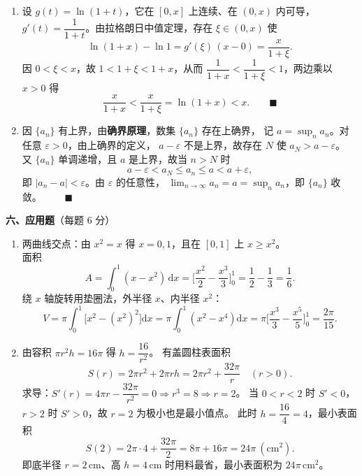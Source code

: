 \documentclass[12pt]{ctexart}
\theoremstyle{definition}
\begin{document}
\begin{enumerate}[label=\textbf{\arabic*.},itemsep=12pt]
\item 设 $g(t)=\ln(1+t)$，它在 $[0,x]$ 上连续、在 $(0,x)$ 内可导，
  $g'(t)=\dfrac{1}{1+t}$。由拉格朗日中值定理，存在 $\xi\in(0,x)$ 使
  \[
  \ln(1+x)-\ln 1=g'(\xi)\,(x-0)=\frac{x}{1+\xi}.
  \]
  因 $0<\xi<x$，故 $1<1+\xi<1+x$，从而
  $\dfrac{1}{1+x}<\dfrac{1}{1+\xi}<1$，两边乘以 $x>0$ 得
  \[
  \frac{x}{1+x}<\frac{x}{1+\xi}=\ln(1+x)<x. \qquad\blacksquare
  \]

\item 因 $\{a_{n}\}$ 有上界，由\textbf{确界原理}，数集 $\{a_{n}\}$ 存在上确界，
  记 $a=\sup_{n}a_{n}$。对任意 $\varepsilon>0$，由上确界的定义，
  $a-\varepsilon$ 不是上界，故存在 $N$ 使 $a_{N}>a-\varepsilon$。
  又 $\{a_{n}\}$ 单调递增，且 $a$ 是上界，故当 $n>N$ 时
  \[
  a-\varepsilon<a_{N}\leq a_{n}\leq a<a+\varepsilon,
  \]
  即 $|a_{n}-a|<\varepsilon$。由 $\varepsilon$ 的任意性，
  $\displaystyle\lim_{n\to\infty}a_{n}=a=\sup_{n}a_{n}$，即 $\{a_{n}\}$ 收敛。
  $\qquad\blacksquare$
\end{enumerate}

\vspace{6pt}
\noindent\textbf{六、应用题}（每题 6 分）

\begin{enumerate}[label=\textbf{\arabic*.},itemsep=12pt]
\item 两曲线交点：由 $x^{2}=x$ 得 $x=0,1$，且在 $[0,1]$ 上 $x\geq x^{2}$。\\
  面积
  \[
  A=\int_{0}^{1}(x-x^{2})\,\mathrm{d}x
  =\Big[\frac{x^{2}}{2}-\frac{x^{3}}{3}\Big]_{0}^{1}
  =\frac12-\frac13=\frac{1}{6}.
  \]
  绕 $x$ 轴旋转用垫圈法，外半径 $x$、内半径 $x^{2}$：
  \[
  V=\pi\int_{0}^{1}\big[x^{2}-(x^{2})^{2}\big]\mathrm{d}x
  =\pi\int_{0}^{1}(x^{2}-x^{4})\mathrm{d}x
  =\pi\Big[\frac{x^{3}}{3}-\frac{x^{5}}{5}\Big]_{0}^{1}
  =\frac{2\pi}{15}.
  \]

\item 由容积 $\pi r^{2}h=16\pi$ 得 $h=\dfrac{16}{r^{2}}$。
  有盖圆柱表面积
  \[
  S(r)=2\pi r^{2}+2\pi r h=2\pi r^{2}+\frac{32\pi}{r}\quad(r>0).
  \]
  求导：$S'(r)=4\pi r-\dfrac{32\pi}{r^{2}}=0\Rightarrow r^{3}=8\Rightarrow r=2$。
  当 $0<r<2$ 时 $S'<0$，$r>2$ 时 $S'>0$，故 $r=2$ 为极小也是最小值点。
  此时 $h=\dfrac{16}{4}=4$，最小表面积
  \[
  S(2)=2\pi\cdot4+\frac{32\pi}{2}=8\pi+16\pi=24\pi\ (\mathrm{cm}^{2}).
  \]
  即底半径 $r=2\,\mathrm{cm}$、高 $h=4\,\mathrm{cm}$ 时用料最省，最小表面积为 $24\pi\,\mathrm{cm}^{2}$。
\end{enumerate}
\end{document}
